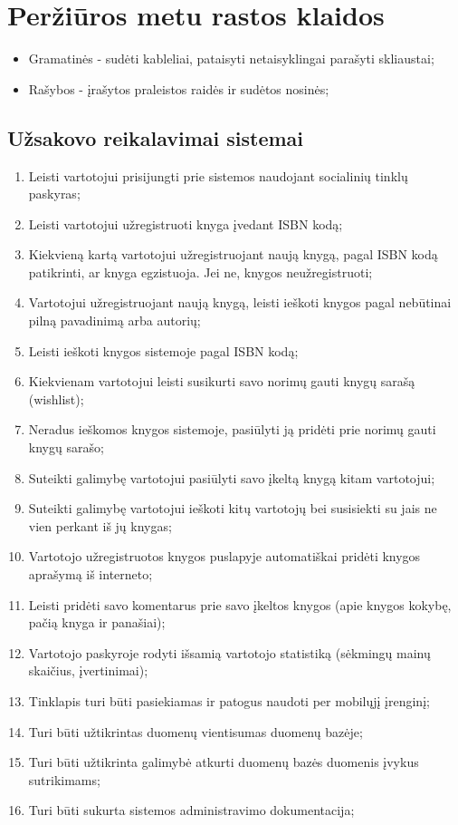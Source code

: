 \documentclass{VUMIFPSkursinis}
\begin{document}
\section{Peržiūros metu rastos klaidos}
	\begin{itemize}
		\item Gramatinės - sudėti kableliai, pataisyti netaisyklingai parašyti skliaustai;
		\item Rašybos - įrašytos praleistos raidės ir sudėtos nosinės;
	\end{itemize}

	
\setcounter{secnumdepth}{0}
\subsection{Užsakovo reikalavimai sistemai}
\begin{enumerate}
	\item Leisti vartotojui prisijungti prie sistemos naudojant socialinių tinklų paskyras;
	\item Leisti vartotojui užregistruoti knyga įvedant ISBN kodą;
	\item Kiekvieną kartą vartotojui užregistruojant naują knygą, pagal ISBN kodą patikrinti,
		ar knyga egzistuoja. Jei ne, knygos neužregistruoti;
	\item Vartotojui užregistruojant naują knygą, leisti ieškoti knygos pagal 
		nebūtinai pilną pavadinimą arba autorių;
	\item Leisti ieškoti knygos sistemoje pagal ISBN kodą;
	\item Kiekvienam vartotojui leisti susikurti savo norimų gauti knygų sarašą (wishlist);
	\item Neradus ieškomos knygos sistemoje, pasiūlyti ją pridėti prie norimų gauti knygų sarašo;
	\item Suteikti galimybę vartotojui pasiūlyti savo įkeltą knygą kitam vartotojui;
	\item Suteikti galimybę vartotojui ieškoti kitų vartotojų bei susisiekti su jais ne vien
		perkant iš jų knygas;
	\item Vartotojo užregistruotos knygos puslapyje automatiškai pridėti knygos aprašymą
		iš interneto;
	\item Leisti pridėti savo komentarus prie savo įkeltos knygos (apie knygos kokybę,
		pačią knyga ir panašiai);
	\item Vartotojo paskyroje rodyti išsamią vartotojo statistiką (sėkmingų mainų skaičius,
		įvertinimai);
	\item Tinklapis turi būti pasiekiamas ir patogus naudoti per mobilųjį įrenginį;
	\item Turi būti užtikrintas duomenų vientisumas duomenų bazėje;
	\item Turi būti užtikrinta galimybė atkurti duomenų bazės duomenis įvykus sutrikimams;
	\item Turi būti sukurta sistemos administravimo dokumentacija;
\end{enumerate}
\end{document}
